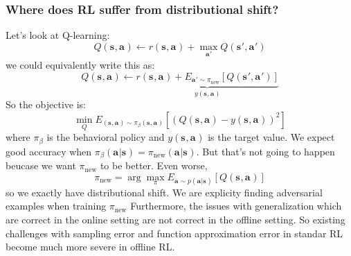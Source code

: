 \documentclass{report}
\newcommand{\argmax}{\arg\!\max}
\begin{document}
\subsubsection{Where does RL suffer from distributional shift?}
Let's look at Q-learning:
\begin{equation}
		Q (\bm{s}_{}, \bm{a}_{} ) \leftarrow
		r (\bm{s}_{}, \bm{a}_{} ) + \max_{\bm{a}_{}'} Q (\bm{s}_{}', \bm{a}_{}' )
\end{equation}
we could equivalently write this as:
\begin{equation}
		Q (\bm{s}_{}, \bm{a}_{} ) \leftarrow
		\underbrace{r (\bm{s}_{}, \bm{a}_{} ) + E_{\bm{a}_{}' \sim \pi_{\text{new}}} \left[    Q (\bm{s}_{}', \bm{a}_{}' )\right]}_{y (\bm{s}_{}, \bm{a}_{} )}
\end{equation}
So the objective is:
\begin{equation}
	\min_{Q} E_{(\bm{s}_{}, \bm{a}_{} )\sim \pi_{\beta}(\bm{s}_{}, \bm{a}_{} )}
	\left[ \left( Q (\bm{s}_{}, \bm{a}_{} ) - y (\bm{s}_{}, \bm{a}_{} ) \right)^{2}  \right] 
\end{equation}
where $ \pi_{\beta}  $ is the behavioral policy and
$ y (\bm{s}_{}, \bm{a}_{} ) $ is the target value.
We expect good accuracy when $ \pi_{\beta} (\bm{a}_{}|\bm{s}_{}) = \pi_{\text{new}} (\bm{a}_{}|\bm{s}_{})  $.
But that's not going to happen beucase we want $ \pi_{\text{new}}  $
to be better.
Even worse,
\begin{equation}
		\pi_{\text{new}} = \argmax_{\pi} E_{\bm{a}_{}\sim p(\bm{a}_{}|\bm{s}_{}) } \left[ Q (\bm{s}_{}, \bm{a}_{} ) \right] 
\end{equation}
so we exactly have distributional shift.
We are explicity finding adversarial examples when training $ \pi_{\text{new}}  $
Furthermore, the issues with generalization which are correct in the online
setting are not correct in the offline setting.
So existing challenges with sampling error and function approximation error in standar RL
become much more severe in offline RL.
\end{document}
